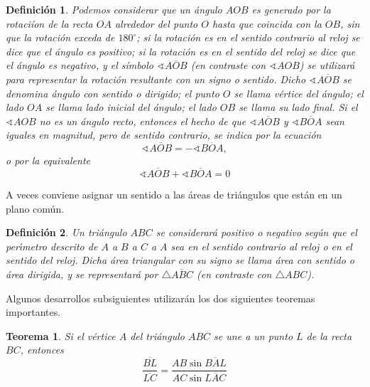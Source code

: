 \documentclass[a4paper,11pt]{article}
\theoremstyle{teoremas}
\newtheorem{teorema}{Teorema}[section]
\theoremstyle{ejemplos}
\theoremstyle{definiciones}
\theoremstyle{lemas}
\newtheorem*{definicion}{Definici\'on}
\begin{document}
\begin{definicion}
 Podemos considerar que un \'angulo $AOB$ es generado por la rotaci\'ion de la recta $OA$ alrededor del punto $O$ hasta que coincida con la $OB$, sin que la rotaci\'on exceda de $180^{\circ}$; si la rotaci\'on es en el sentido contrario al reloj se dice que el \'angulo es \textit{positivo}; si la rotaci\'on es en el sentido del reloj se dice que el \'angulo es \textit{negativo}, y el s\'imbolo $\sphericalangle\overline{AOB}$ (en contraste con $\sphericalangle AOB$) se utilizar\'a para representar la rotaci\'on resultante con un signo o sentido. Dicho $\sphericalangle\overline{AOB}$ se denomina \textit{\'angulo con sentido} o \textit{dirigido}; el punto $O$ se llama \textit{v\'ertice del \'angulo}; el lado $OA$ se llama \textit{lado inicial} del \'angulo; el lado $OB$ se llama su \textit{lado final}. Si el $\sphericalangle AOB$ no es un \'angulo recto, entonces el hecho de que $\sphericalangle \overline{AOB}$ y $\sphericalangle\overline{BOA}$ sean iguales en magnitud, pero de sentido contrario, se indica por la ecuaci\'on
 \begin{equation*}
  \sphericalangle\overline{AOB} = - \sphericalangle\overline{BOA},
 \end{equation*}
 o por la equivalente
 \begin{equation*}
  \sphericalangle\overline{AOB} + \sphericalangle\overline{BOA} = 0
 \end{equation*}
\end{definicion}

A veces conviene asignar un sentido a las \'areas de tri\'angulos que est\'an en un plano com\'un.

\begin{definicion}
 Un tri\'angulo $ABC$ se considerar\'a \textit{positivo} o \textit{negativo} seg\'un que el per\'{\i}metro descrito de $A$ a $B$ a $C$ a $A$ sea en el sentido contrario al reloj o en el sentido del reloj. Dicha \'area triangular con su signo se llama \textit{\'area con sentido} o \textit{\'area dirigida}, y se representar\'a por $\triangle\overline{ABC}$ (en contraste con $\triangle ABC$).
\end{definicion} 

Algunos desarrollos subsiguientes utilizar\'an los dos siguientes teoremas importantes.

\begin{teorema}
 Si el v\'ertice $A$ del tri\'angulo $ABC$ se une a un punto $L$ de la recta $BC$, entonces
 \begin{equation*}
  \frac{\overline{BL}}{\overline{LC}} =
  \frac{AB \sin{ \overline{BAL}}}{ AC\sin{\overline{LAC}}}
 \end{equation*}
\end{teorema}
\end{document}
